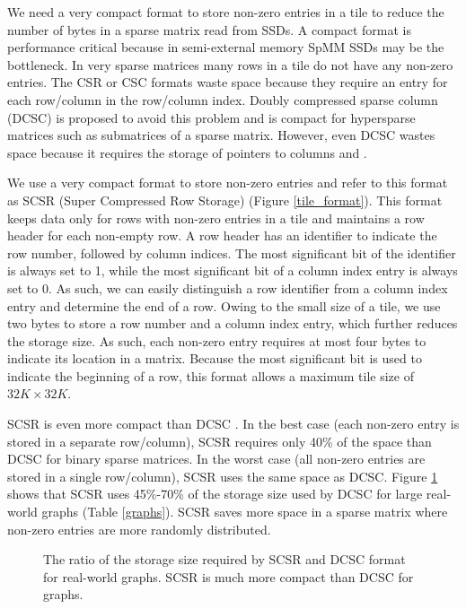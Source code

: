 We need a very compact format to store non-zero entries in a tile to reduce
the number of bytes in a sparse matrix read from SSDs. A compact format is
performance critical because in semi-external memory SpMM SSDs
may be the bottleneck. In very sparse matrices many rows in a tile
do not have any non-zero entries. The CSR or CSC formats waste space because
they require an entry for each row/column in the row/column index. Doubly
compressed sparse column (DCSC) \cite{Buluc08} is proposed to avoid this problem
and is compact for hypersparse matrices such as submatrices of a sparse matrix.
However, even DCSC wastes space because it requires the storage of
pointers to columns and .

We use a very compact format to store non-zero entries and refer to this
format as SCSR (Super Compressed Row Storage) (Figure \ref{tile_format}).
This format keeps data only for rows with non-zero entries in a tile and
maintains a row header for each non-empty row. A row header has an identifier
to indicate the row number, followed by column indices. 
The most significant bit of the identifier is always set to 1, while the most
significant bit of a column index entry is always set to 0. As such, we can easily
distinguish a row identifier from a column index entry and determine the end
of a row. Owing to the small size of a tile, we use two bytes to store a row
number and a column index entry, which further reduces the storage size. As such,
each non-zero entry requires at most four bytes to indicate its location in
a matrix. Because the most significant bit is used to indicate the beginning
of a row, this format allows a maximum tile size of $32K \times 32K$.

SCSR is
even more compact than DCSC \cite{Buluc08}. In the best case (each non-zero
entry is stored in a separate row/column), SCSR requires only 40\% of the space
than DCSC for binary sparse matrices. In the worst case (all non-zero entries
are stored in a single row/column), SCSR uses the same space as DCSC. Figure
\ref{fig:storage} shows that SCSR uses 45\%-70\% of the storage size used by
DCSC for large real-world graphs (Table \ref{graphs}). SCSR saves more space
in a sparse matrix where non-zero entries are more randomly distributed.

\begin{figure}
	\begin{center}
		\footnotesize
		
		\caption{The ratio of the storage size required by SCSR and DCSC
			\cite{Buluc08} format for real-world graphs. SCSR is much more
		compact than DCSC for graphs.}
		\label{fig:storage}
	\end{center}
\end{figure}

